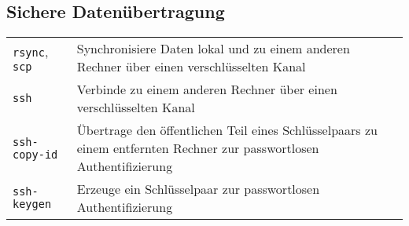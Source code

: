 \documentclass[10pt,a4paper]{article}
\begin{document}
\begin{multicols}{2}
\section{Sichere Datenübertragung}
\begin{tabular}{ p{2.5cm} p{8.5cm} }
  \hline
  \texttt{rsync}, \texttt{scp} & Synchronisiere Daten lokal und zu einem anderen Rechner über einen verschlüsselten Kanal \\
  \texttt{ssh} & Verbinde zu einem anderen Rechner über einen verschlüsselten Kanal\\
  \texttt{ssh-copy-id} & Übertrage den öffentlichen Teil eines Schlüsselpaars zu einem entfernten Rechner zur passwortlosen Authentifizierung\\
  \texttt{ssh-keygen} & Erzeuge ein Schlüsselpaar zur passwortlosen Authentifizierung\\
  \hline
\end{tabular}

~ \\

\columnbreak


\end{multicols}
\end{document}
